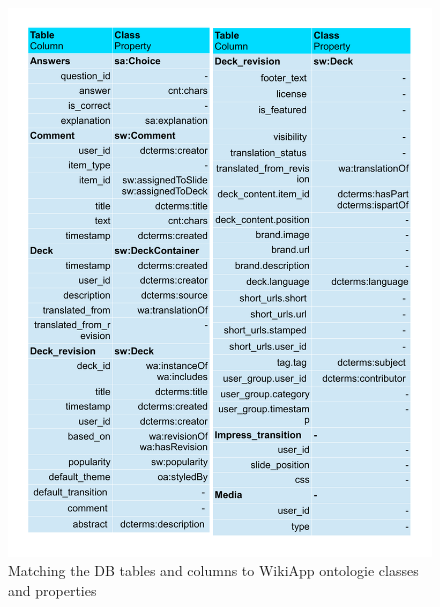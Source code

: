 \begin{figure}[!b]
	\centering
		\includegraphics[width=\columnwidth]{images/mapping_pages1.pdf}
		\caption{Matching the DB tables and columns to WikiApp ontologie classes and properties}
	\label{fig:wa_matching_1}
\end{figure}

